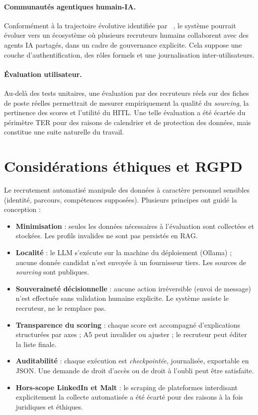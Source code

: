\paragraph{Communautés agentiques humain-IA.}
Conformément à la trajectoire évolutive identifiée par \citeauthor{milosevic_rabhi}~\cite{milosevic_rabhi}, le système pourrait évoluer vers un écosystème où plusieurs recruteurs humains collaborent avec des agents IA partagés, dans un cadre de gouvernance explicite. Cela suppose une couche d'authentification, des rôles formels et une journalisation inter-utilisateurs.

\paragraph{Évaluation utilisateur.}
Au-delà des tests unitaires, une évaluation par des recruteurs réels sur des fiches de poste réelles permettrait de mesurer empiriquement la qualité du \emph{sourcing}, la pertinence des scores et l'utilité du HITL. Une telle évaluation a été écartée du périmètre TER pour des raisons de calendrier et de protection des données, mais constitue une suite naturelle du travail.

\section{Considérations éthiques et RGPD}

Le recrutement automatisé manipule des données à caractère personnel sensibles (identité, parcours, compétences supposées). Plusieurs principes ont guidé la conception :

\begin{itemize}[leftmargin=1cm]
\item \textbf{Minimisation} : seules les données nécessaires à l'évaluation sont collectées et stockées. Les profils invalides ne sont pas persistés en RAG.
\item \textbf{Localité} : le LLM s'exécute sur la machine du déploiement (Ollama) ; aucune donnée candidat n'est envoyée à un fournisseur tiers. Les sources de \emph{sourcing} sont publiques.
\item \textbf{Souveraineté décisionnelle} : aucune action irréversible (envoi de message) n'est effectuée sans validation humaine explicite. Le système assiste le recruteur, ne le remplace pas.
\item \textbf{Transparence du scoring} : chaque score est accompagné d'explications structurées par axes ; A5 peut invalider ou ajuster ; le recruteur peut éditer la liste finale.
\item \textbf{Auditabilité} : chaque exécution est \emph{checkpointée}, journalisée, exportable en JSON. Une demande de droit d'accès ou de droit à l'oubli peut être satisfaite.
\item \textbf{Hors-scope LinkedIn et Malt} : le scraping de plateformes interdisant explicitement la collecte automatisée a été écarté pour des raisons à la fois juridiques et éthiques.
\end{itemize}

